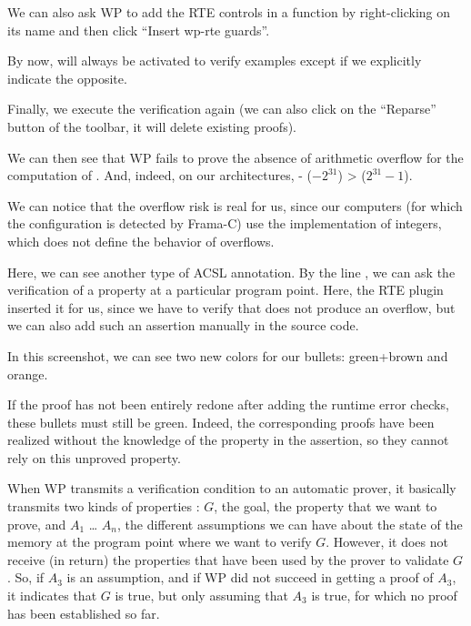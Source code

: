 

We can also ask WP to add the RTE controls in a function by
right-clicking on its name and then click ``Insert wp-rte guards''.


\begin{Information}
  By now,  will always be activated to verify examples
  except if we explicitly indicate the opposite.
\end{Information}


Finally, we execute the verification again (we can also click on the
``Reparse'' button of the toolbar, it will delete existing proofs).

We can then see that WP fails to prove the absence of arithmetic
overflow for the computation of . And, indeed, on our
architectures, - ($-2^{31}$) >  ($2^{31}-1$).





\begin{Information}
We can notice that the overflow risk
is real for us, since our computers (for which the
configuration is detected by Frama-C) use the
implementation of integers, which does not define
the behavior of overflows.
\end{Information}


Here, we can see another type of ACSL annotation. By the line
, we can ask the verification of a
property at a particular program point. Here, the RTE plugin inserted it for
us, since
we have to verify that  does not produce an overflow, but
we can also add such an assertion manually in the source code.



In this screenshot, we can see two new colors for our bullets:
green+brown and orange.



If the proof has not been entirely redone after adding the runtime error
checks, these bullets must still be green. Indeed, the corresponding
proofs have been realized without the knowledge of the property in the
assertion, so they cannot rely on this unproved property.



When WP transmits a verification condition to an automatic prover, it
basically transmits two kinds of properties : $G$, the goal, the
property that we want to prove, and $A_1$ \ldots{} $A_n$, the
different assumptions we can have about the state of the memory at the
program point where we want to verify $G$. However, it does not
receive (in return) the properties that have been used by the prover to
validate $G$. So, if $A_3$ is an assumption, and if WP did not
succeed in getting a proof of $A_3$, it indicates that $G$ is true,
but only assuming that $A_3$ is true, for which no proof has been established
so far.



